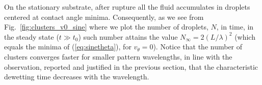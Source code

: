 \documentclass[twocolumn,amsmath,amssymb,showpacs,pre,nofootinbib,superscriptaddress]{revtex4-1} %
\begin{document}
On the stationary substrate, after rupture all the fluid accumulates in droplets centered at contact angle minima.
Consequently, as we see from Fig.~\ref{fig:clusters_v0_sine} where we plot the number of droplets, $N$, in time, 
in the steady state ($t \gg t_0$) such number attains the value $N_{\infty} = 2(L/\lambda)^2$
(which equals the minima of (\ref{eq:sinetheta}), for $v_{\theta}=0$).
Notice that the number of clusters converges faster for smaller pattern wavelengths, in line with the observation, reported
and justified in the previous section, that the characteristic dewetting time decreases with the wavelength.\\
\end{document}
